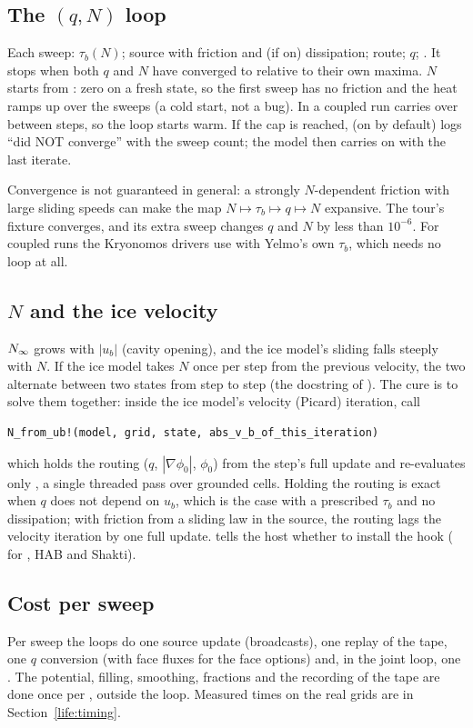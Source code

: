 \subsection{The $(q, N)$ loop}\label{fp:qN}
Each sweep: $\tau_b(N)$; source with friction and (if on) dissipation; route; $q$; . It stops when both $q$ and
$N$ have converged to  relative to their own maxima. $N$ starts from : zero on a fresh state, so the
first sweep has no friction and the heat ramps up over the sweeps (a cold start, not a bug). In a coupled run 
carries over between steps, so the loop starts warm. If the cap is reached,  (on by default) logs ``did NOT
converge'' with the sweep count; the model then carries on with the last iterate.

Convergence is not guaranteed in general: a strongly $N$-dependent friction with large sliding speeds can make the map
$N\mapsto\tau_b\mapsto q\mapsto N$ expansive. The tour's fixture converges, and its extra sweep changes $q$ and $N$ by less than
$10^{-6}$. For coupled runs the Kryonomos drivers use  with Yelmo's own $\tau_b$, which needs no
loop at all.

\subsection{$N$ and the ice velocity}\label{fp:ub}
${N_\infty}$ grows with $|u_b|$ (cavity opening), and the ice model's sliding falls steeply with $N$. If the ice model takes $N$ once
per step from the previous velocity, the two alternate between two states from step to step (the docstring of
). The cure is to solve them together: inside the ice model's velocity (Picard) iteration, call
\begin{verbatim}
N_from_ub!(model, grid, state, abs_v_b_of_this_iteration)
\end{verbatim}
which holds the routing ($q$, $|\nabla\phi_0|$, $\phi_0$) from the step's full update and re-evaluates only , a
single threaded pass over grounded cells. Holding the routing is exact when $q$ does not depend on $u_b$, which is the case
with a prescribed $\tau_b$ and no dissipation; with friction from a sliding law in the source, the routing lags the velocity
iteration by one full update.  tells the host whether to install the hook ( for
, HAB and Shakti).

\subsection{Cost per sweep}\label{fp:cost}
Per sweep the loops do one source update (broadcasts), one replay of the tape, one $q$ conversion (with face fluxes for the
face options) and, in the joint loop, one . The potential, filling, smoothing, fractions and the recording of
the tape are done once per , outside the loop. Measured times on the real grids are in
Section~\ref{life:timing}.
